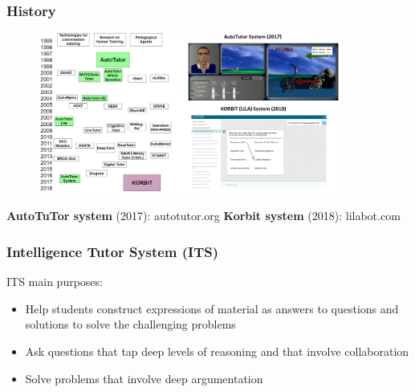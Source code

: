 \documentclass{beamer}
\begin{document}
\begin{frame}
\frametitle{History}

		
		\begin{figure}
		
			\includegraphics[width=100mm]{history.png}\\
		
				
	\end{figure}
	
{\tiny  \textbf{AutoTuTor system} (2017):  autotutor.org}              {\tiny \textbf{Korbit system }(2018):   lilabot.com}

	
		
	

\end{frame}
\begin{frame}
\frametitle{Intelligence Tutor System (ITS) }
	\begin{block}{ITS main purposes: }
	\begin{itemize}
		\item Help students construct expressions of material as answers to questions and solutions to solve the challenging problems
		\item Ask questions that tap deep levels of reasoning and that involve collaboration
		\item Solve problems that involve deep argumentation
	\end{itemize} 
\end{block}
\end{frame}
\end{document}
